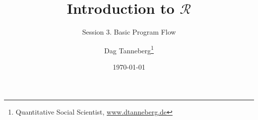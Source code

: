 \usepackage[utf8]{inputenc}
\usepackage{hyperref}
\usepackage{graphicx}
\usepackage{booktabs}

\title{Introduction to $\mathcal{R}$}
\subtitle{Session 3. Basic Program Flow}
\author{Dag Tanneberg\thanks{%
    Quantitative Social Scientist,
    \href{http://www.dtanneberg.de}{www.dtanneberg.de}
    }
}
\date{\today}
\hypersetup{colorlinks, urlcolor = red, linkcolor = }